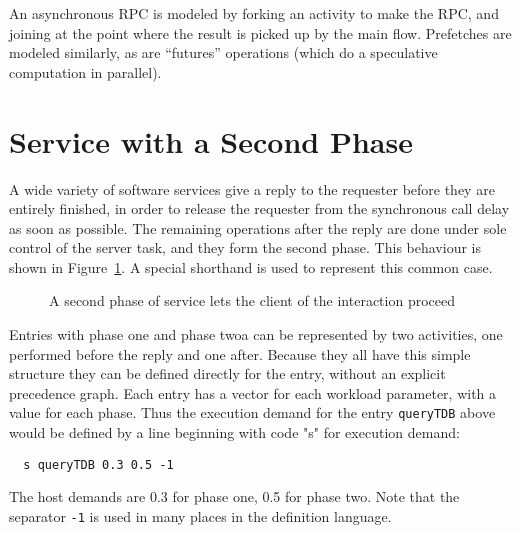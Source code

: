 \documentclass[11pt]{article}
\begin{document}
An asynchronous RPC is modeled by forking an 
activity to make the RPC, and joining at the point where the result is picked up by the main flow.
Prefetches are modeled similarly, as are ``futures'' operations (which do a speculative computation
in parallel). 

\section{Service with a Second Phase}
\label{sec:second-phase}

A wide variety of software services give a reply to the requester
before they are entirely finished, in order to release the requester
from the synchronous call delay as soon as possible. The remaining
operations after the reply are done under sole control of the server
task, and they form the second phase. This behaviour is shown in
Figure~\ref{fig:second-phase}.  A special shorthand is used to
represent this common case.

\begin{figure}[htbp]
  \centering
  \caption{A second phase of service lets the client of the interaction proceed}
  \label{fig:second-phase}
\end{figure}

Entries with phase one and phase twoa can be represented by two
activities, one performed before the reply and one after. Because they
all have this simple structure they can be defined directly for the
entry, without an explicit precedence graph. Each entry has a vector
for each workload parameter, with a value for each phase. Thus the
execution demand for the entry \texttt{queryTDB} above would be defined by a
line beginning with code "s" for execution demand:  
\begin{verbatim}
  s queryTDB 0.3 0.5 -1
\end{verbatim}
The host demands are 0.3 for phase one, 0.5 for phase two. Note that the
separator \texttt{-1} is used in many places in the definition language.
\end{document}
